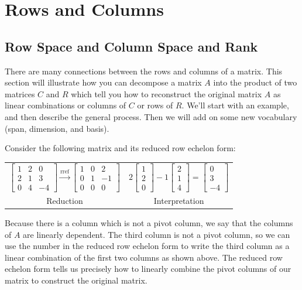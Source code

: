 \documentclass[10pt]{article}
\begin{document}
\section{Rows and Columns}
\subsection{Row Space and Column Space and Rank}
There are many connections between the rows and columns of a matrix.  This section will illustrate how you can decompose a matrix $A$ into the product of two matrices $C$ and $R$ which tell you how to reconstruct the original matrix $A$ as linear combinations or columns of $C$ or rows of $R$. We'll start with an example, and then describe the general process. Then we will add on some new vocabulary (span, dimension, and basis).


Consider the following matrix and its reduced row echelon form:
\begin{center}\begin{tabular}{cc}
$\begin {bmatrix} 1&2&0\\2&1&3\\0&4&-4 \end {bmatrix}
\xrightarrow{\text{rref}}
\begin {bmatrix} 1&0&2\\0&1&-1\\0&0&0 \end {bmatrix}$  &
$2\begin {bmatrix} 1\\2\\0 \end {bmatrix}
-1\begin {bmatrix} 2\\1\\4 \end {bmatrix}
=\begin {bmatrix} 0\\3\\-4 \end {bmatrix}
$\\
Reduction & Interpretation
\end{tabular}\end{center}
Because there is a column which is not a pivot column, we say that the columns of $A$ are linearly dependent. The third column is not a pivot column, so we can use the number in the reduced row echelon form to write the third column as a linear combination of the first two columns as shown above. The reduced row echelon form tells us precisely how to linearly combine the pivot columns of our matrix to construct the original matrix.  
\end{document}
